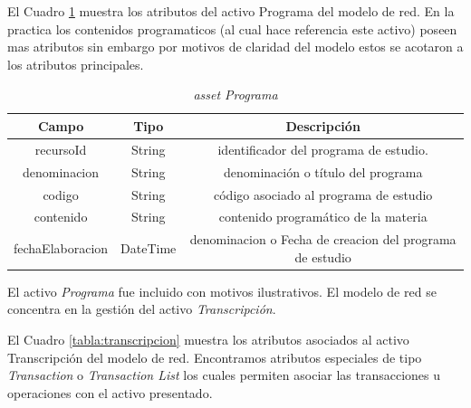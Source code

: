 El Cuadro \ref{tabla:programa} muestra los atributos del activo Programa del modelo de red.  En la practica los contenidos programaticos (al cual hace referencia este activo) poseen mas atributos sin embargo por motivos de claridad del modelo estos se acotaron a los atributos principales.
\begin{table}[H]
    \caption{\textit{asset Programa}}
    \centering
     \begin{tabular}{ |c| c| c| }
        \hline
        \textbf{Campo} & \textbf{Tipo} & \textbf{Descripción} \\
             \hline    
             recursoId & String     & identificador del programa de estudio.\\
             denominacion & String & denominación o título del programa\\
             codigo & String & código asociado al programa de estudio\\
             contenido & String & contenido programático de la materia\\
             fechaElaboracion & DateTime & denominacion o Fecha de creacion del programa de estudio\\
             \hline
        \end{tabular}
    \label{tabla:programa}
\end{table}


El activo \textit{Programa} fue incluido con motivos ilustrativos. El modelo de red se concentra en la gestión del activo \textit{Transcripción}.

El Cuadro \ref{tabla:transcripcion} muestra los atributos asociados al activo Transcripción del modelo de red.
Encontramos atributos especiales de tipo \textit{Transaction} o \textit{Transaction List} los cuales permiten asociar las transacciones u operaciones con el activo presentado.

